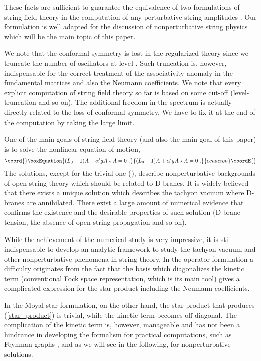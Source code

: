 \documentclass[a4paper,aps,preprint,nofootinbib,eqsecnum]{revtex4}
\begin{document}
These facts are sufficient to guarantee the equivalence of two formulations
of string field theory in the computation of any perturbative string
amplitudes \cite{BKM1}. Our formulation is well adapted for the discussion
of nonperturbative string physics which will be the main topic of this paper.

We note that the conformal symmetry is lost in the regularized theory since
we truncate the number of oscillators at level \coordHE{}. Such truncation is,
however, indispensable for the correct treatment of the associativity
anomaly in the fundamental matrices \cite{BM1} and also the Neumann
coefficients. We note that every explicit computation of string field theory
so far is based on some cut-off (level-truncation and so on). The additional
freedom in the spectrum is actually directly related to the loss of
conformal symmetry. We have to fix it at the end of the computation by
taking the large \coordHE{} limit.

One of the main goals of string field theory (and also the main goal of this
paper) is to solve the nonlinear equation of motion,
\begin{equation}\coord{}\boxEquation{
(L_{0}-1)A+{\alpha ^{\prime }}gA\star A=0\,\,.  \label{eom}
}{
(L_{0}-1)A+{\alpha ^{\prime }}gA\star A=0\,\,.  }{ecuacion}\coordE{}\end{equation}%
The solutions, except for the trivial one (\coordHE{}), describe nonperturbative
backgrounds of open string theory which should be related to D-branes. It is
widely believed that there exists a unique solution \coordHE{} which describes
the tachyon vacuum where D-branes are annihilated. There exist a large
amount of numerical evidence \cite{Numerics} that confirms the existence and
the desirable properties of such solution (D-brane tension, the absence of
open string propagation and so on).

While the achievement of the numerical study is very impressive, it is still
indispensable to develop an analytic framework to study the tachyon vacuum
and other nonperturbative phenomena in string theory. In the operator
formulation a difficulty originates from the fact that the basis which
diagonalizes the kinetic term (conventional Fock space representation, which
is its main tool) gives a complicated expression for the star product
including the Neumann coefficients.

In the Moyal star formulation, on the other hand, the star product that
produces (\ref{star_product}) is trivial, while the kinetic term becomes
off-diagonal. The complication of the kinetic term is, however, manageable
and has not been a hindrance in developing the formalism for practical
computations, such as Feynman graphs \cite{BKM1}, and as we will see in the
following, for nonperturbative solutions.
\end{document}

